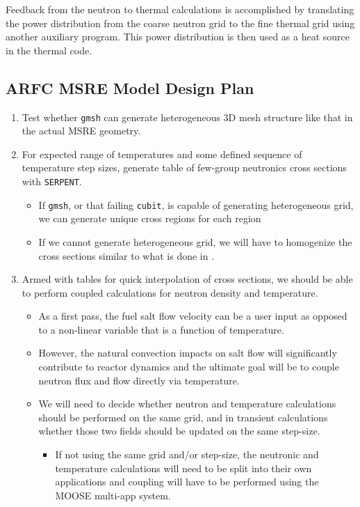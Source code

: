 \documentclass{article}
\let\Oldsubsection\subsection
\renewcommand{\subsection}{\FloatBarrier\Oldsubsection}
\newcommand{\code}[1]{\texttt{#1}}
\begin{document}
Feedback from the neutron to thermal calculations is accomplished by translating
the power distribution from the coarse neutron grid to the fine thermal grid
using another auxiliary program. This power distribution is then used as a heat
source in the thermal code.

\subsection{\gls{ARFC} \gls{MSRE} Model Design Plan}

\begin{enumerate}
\item Test whether \code{gmsh} can generate heterogeneous 3D mesh structure
  like that in the actual \gls{MSRE} geometry.
\item For expected range of temperatures and some defined sequence of
  temperature step sizes, generate table of few-group neutronics cross sections
  with \code{SERPENT}.
  \begin{itemize}
    \item If \code{gmsh}, or that failing \code{cubit}, is capable of generating
      heterogeneous grid, we can generate unique cross regions for each region
    \item If we cannot generate heterogeneous grid, we will have to homogenize
      the cross sections similar to what is done in
      \cite{kophazi_development_2009}.
  \end{itemize}
\item Armed with tables for quick interpolation of cross sections, we should be
  able to perform coupled calculations for neutron density and
  temperature.
  \begin{itemize}
    \item As a first pass, the fuel salt flow velocity can be a user input as
            opposed to a non-linear variable that is a function of temperature.
    \item However, the natural convection impacts on salt flow will
            significantly contribute to reactor dynamics and the ultimate goal
            will be to couple neutron flux and flow directly via
            temperature.
    \item We will need to decide whether neutron and temperature calculations
      should be performed on the same grid, and in transient calculations
      whether those two fields should be updated on the same step-size.
      \begin{itemize}
        \item If not using the same grid and/or step-size, the neutronic and
          temperature calculations will need to be split into their own
          applications and coupling will have to be performed using the MOOSE
          multi-app system.
      \end{itemize}
  \end{itemize}
\end{enumerate}
\end{document}
